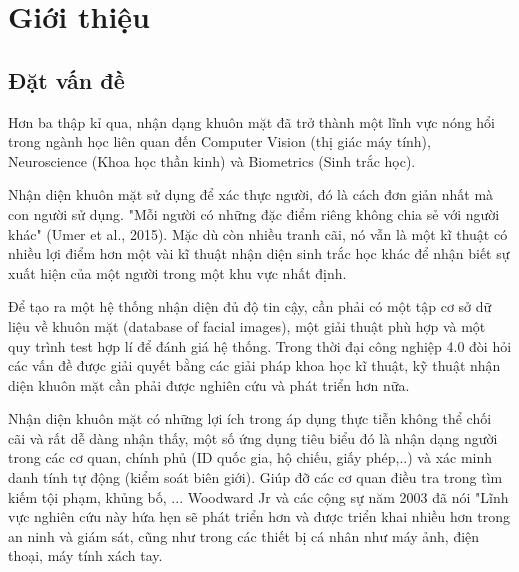 \documentclass[a4paper]{report}
\begin{document}
\setlength{\parskip}{0.5em}
\pagestyle{fancy}

\chapter{Giới thiệu}
\section{Đặt vấn đề}
Hơn ba thập kỉ qua, nhận dạng khuôn mặt đã trở thành một lĩnh vực nóng hổi trong ngành học liên quan đến Computer Vision (thị giác máy tính), Neuroscience (Khoa học thần kinh) và Biometrics (Sinh trắc học). 
\par\noindent
Nhận diện khuôn mặt sử dụng để xác thực người, đó là cách đơn giản nhất mà con người sử dụng. "Mỗi người có những đặc điểm riêng không chia sẻ với người khác" (Umer et al., 2015). Mặc dù còn nhiều tranh cãi, nó vẫn là một kĩ thuật có nhiều lợi điểm hơn một vài kĩ thuật nhận diện sinh trắc học khác để nhận biết sự xuất hiện của một người trong một khu vực nhất định.
\par\noindent
Để tạo ra một hệ thống nhận diện đủ độ tin cậy, cần phải có một tập cơ sở dữ liệu về khuôn mặt (database of facial images), một giải thuật phù hợp và một quy trình test hợp lí để đánh giá hệ thống. Trong thời đại công nghiệp 4.0 đòi hỏi các vấn đề được giải quyết bằng các giải pháp khoa học kĩ thuật, kỹ thuật nhận diện khuôn mặt cần phải được nghiên cứu và phát triển hơn nữa. 
\par\noindent
Nhận diện khuôn mặt có những lợi ích trong áp dụng thực tiễn không thể chối cãi và rất dễ dàng nhận thấy, một số ứng dụng tiêu biểu đó là nhận dạng người trong các cơ quan, chính phủ (ID quốc gia, hộ chiếu, giấy phép,..) và xác minh danh tính tự động (kiểm soát biên giới). Giúp đỡ các cơ quan điều tra trong tìm kiếm tội phạm, khủng bố, ... Woodward Jr và các cộng sự năm 2003 đã nói "Lĩnh vực nghiên cứu này hứa hẹn sẽ phát triển hơn và được triển khai nhiều hơn trong an ninh và giám sát, cũng như trong các thiết bị cá nhân như máy ảnh, điện thoại, máy tính xách tay.
\end{document}
